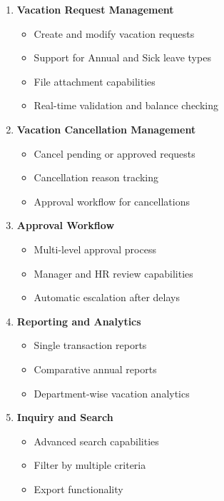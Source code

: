 \documentclass[12pt,a4paper]{article}
\begin{document}
\begin{enumerate}
    \item \textbf{Vacation Request Management}
    \begin{itemize}
        \item Create and modify vacation requests
        \item Support for Annual and Sick leave types
        \item File attachment capabilities
        \item Real-time validation and balance checking
    \end{itemize}
    
    \item \textbf{Vacation Cancellation Management}
    \begin{itemize}
        \item Cancel pending or approved requests
        \item Cancellation reason tracking
        \item Approval workflow for cancellations
    \end{itemize}
    
    \item \textbf{Approval Workflow}
    \begin{itemize}
        \item Multi-level approval process
        \item Manager and HR review capabilities
        \item Automatic escalation after delays
    \end{itemize}
    
    \item \textbf{Reporting and Analytics}
    \begin{itemize}
        \item Single transaction reports
        \item Comparative annual reports
        \item Department-wise vacation analytics
    \end{itemize}
    
    \item \textbf{Inquiry and Search}
    \begin{itemize}
        \item Advanced search capabilities
        \item Filter by multiple criteria
        \item Export functionality
    \end{itemize}
\end{enumerate}
\end{document}
